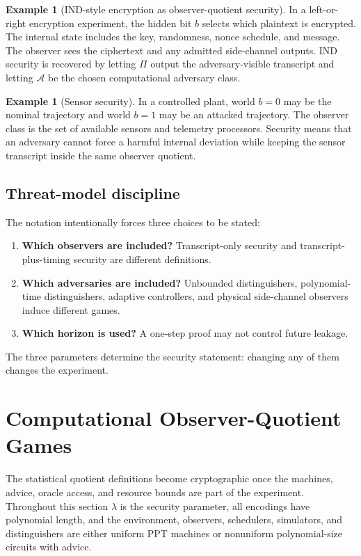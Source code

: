 \documentclass[11pt]{article}
\theoremstyle{definition}
\newtheorem{example}[definition]{Example}
\theoremstyle{plain}
\theoremstyle{remark}
\newcommand{\cA}{\mathcal{A}}
\begin{document}
\begin{example}[IND-style encryption as observer-quotient security]
In a left-or-right encryption experiment, the hidden bit $b$ selects which plaintext is encrypted. The internal state includes the key, randomness, nonce schedule, and message. The observer sees the ciphertext and any admitted side-channel outputs. IND security is recovered by letting $\Pi$ output the adversary-visible transcript and letting $\cA$ be the chosen computational adversary class.
\end{example}

\begin{example}[Sensor security]
In a controlled plant, world $b=0$ may be the nominal trajectory and world $b=1$ may be an attacked trajectory. The observer class is the set of available sensors and telemetry processors. Security means that an adversary cannot force a harmful internal deviation while keeping the sensor transcript inside the same observer quotient.
\end{example}

\subsection{Threat-model discipline}

The notation intentionally forces three choices to be stated:
\begin{enumerate}[leftmargin=2em]
    \item \textbf{Which observers are included?} Transcript-only security and transcript-plus-timing security are different definitions.
    \item \textbf{Which adversaries are included?} Unbounded distinguishers, polynomial-time distinguishers, adaptive controllers, and physical side-channel observers induce different games.
    \item \textbf{Which horizon is used?} A one-step proof may not control future leakage.
\end{enumerate}
The three parameters determine the security statement: changing any of them changes the experiment.


\section{Computational Observer-Quotient Games}

The statistical quotient definitions become cryptographic once the machines, advice, oracle access, and resource bounds are part of the experiment. Throughout this section $\lambda$ is the security parameter, all encodings have polynomial length, and the environment, observers, schedulers, simulators, and distinguishers are either uniform PPT machines or nonuniform polynomial-size circuits with advice.
\end{document}

